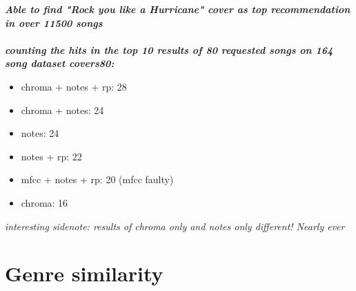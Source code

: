 \textit{\textbf{Able to find "Rock you like a Hurricane" cover as top recommendation in over 11500 songs\\}}
\ \\
\textit{\textbf{counting the hits in the top 10 results of 80 requested songs on 164 song dataset covers80:\\}}
\begin{itemize}
	\setlength\itemsep{-0.5em}
	\item chroma + notes + rp: 28
	\item chroma + notes: 24
	\item notes: 24
	\item notes + rp: 22
	\item mfcc + notes + rp: 20 (mfcc faulty)
	\item chroma: 16

\end{itemize}
\textit{interesting sidenote: results of chroma only and notes only different! Nearly ever}

\section{Genre similarity}\label{genrerec}

